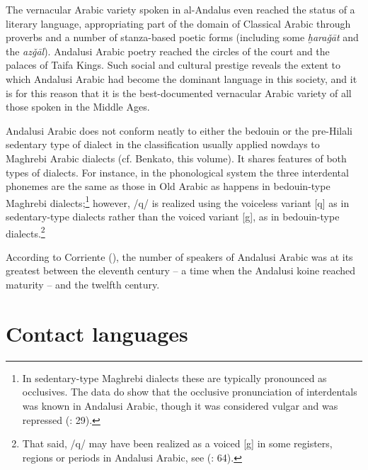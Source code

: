 \documentclass[output=paper,modfonts,nonflat]{langsci/langscibook}
\begin{document}
The vernacular Arabic variety spoken in al-Andalus even reached the status of a literary language, appropriating part of the domain of Classical Arabic through proverbs and a number of stanza-based poetic forms (including some \textit{ḫaraǧāt} and the \textit{azǧāl}). Andalusi Arabic poetry reached the circles of the court and the palaces of Taifa Kings. Such social and cultural prestige reveals the extent to which Andalusi Arabic had become the dominant language in this society, and it is for this reason that it is the best-documented vernacular Arabic variety of all those spoken in the Middle Ages. 

Andalusi Arabic does not conform neatly to either the bedouin or the pre-Hilali sedentary type of dialect in the classification usually applied nowdays to Maghrebi Arabic dialects (cf. Benkato, this volume). It shares features of both types of dialects. For instance, in the phonological system the three interdental phonemes are the same as those in Old Arabic as happens in bedouin-type Maghrebi dialects;\footnote{In sedentary-type Maghrebi dialects these are typically pronounced as occlusives. The data do show that the occlusive pronunciation of interdentals was known in Andalusi Arabic, though it was considered vulgar and was repressed (\citealt{CorrientePereiraVicente2015}: 29).}  however, /q/ is realized using the voiceless variant [q] as in sedentary-type dialects rather than the voiced variant [g], as in bedouin-type dialects.\footnote{That said, /q/ may have been realized as a voiced [g] in some registers, regions or periods in Andalusi Arabic, see (\citealt{CorrientePereiraVicente2015}: 64).}

According to Corriente (\citeyear[34]{Corriente1992book}), the number of speakers of Andalusi Arabic was at its greatest between the eleventh century – a time when the Andalusi koine reached maturity – and the twelfth century. 


\section{Contact languages}
\end{document}
